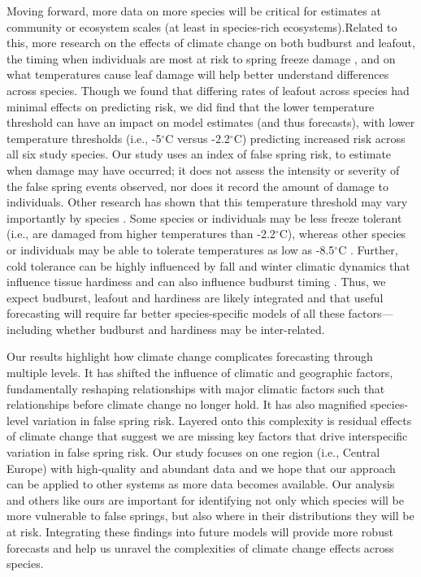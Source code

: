 \documentclass{article}\usepackage[]{graphicx}\usepackage[]{color}
\begin{document}
Moving forward, more data on more species will be critical for estimates at community or ecosystem scales (at least in species-rich ecosystems).Related to this, more research on the effects of climate change on both budburst and leafout, the timing when individuals are most at risk to spring freeze damage \citep{Lenz2016,Chamberlain2019}, and on what temperatures cause leaf damage will help better understand differences across species. Though we found that differing rates of leafout across species had minimal effects on predicting risk, we did find that the lower temperature threshold can have an impact on model estimates (and thus forecasts), with lower temperature thresholds (i.e., -5$^{\circ}$C versus -2.2$^{\circ}$C) predicting increased risk across all six study species. Our study uses an index of false spring risk, to estimate when damage may have occurred; it does not assess the intensity or severity of the false spring events observed, nor does it record the amount of damage to individuals. Other research has shown that this temperature threshold may vary importantly by species \citep{Lenz2013,Korner2016,bennett2018globtherm,  Zhuo2018}. Some species or individuals may be less freeze tolerant (i.e., are damaged from higher temperatures than -2.2$^{\circ}$C), whereas other species or individuals may be able to tolerate temperatures as low as -8.5$^{\circ}$C \citep{Lenz2016}. Further, cold tolerance can be highly influenced by fall and winter climatic dynamics that influence tissue hardiness \citep{Charrier2011, Vitasse2014,Hofmann2015} and can also influence budburst timing \citep{Morin2007}. Thus, we expect budburst, leafout and hardiness are likely integrated and that useful forecasting will require far better species-specific models of all these factors---including whether budburst and hardiness may be inter-related. 

Our results highlight how climate change complicates forecasting through multiple levels. It has shifted the influence of climatic and geographic factors, fundamentally reshaping relationships with major climatic factors such that relationships before climate change no longer hold. It has also magnified species-level variation in false spring risk. Layered onto this complexity is residual effects of climate change that suggest we are missing key factors that drive interspecific variation in false spring risk. Our study focuses on one region (i.e., Central Europe) with high-quality and abundant data and we hope that our approach can be applied to other systems as more data becomes available. Our analysis and others like ours are important for identifying not only which species will be more vulnerable to false springs, but also where in their distributions they will be at risk. Integrating these findings into future models will provide more robust forecasts and help us unravel the complexities of climate change effects across species.
\end{document}
